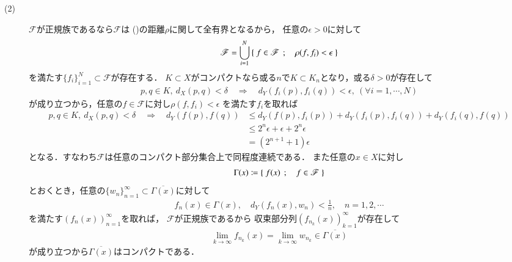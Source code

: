 \begin{prf}
\begin{description}
			\item[(2)] 
				$\mathscr{F}$が正規族であるなら$\mathscr{F}$は
				()の距離$\rho$に関して全有界となるから，
				任意の$\epsilon > 0$に対して
				\begin{align}
					\mathscr{F}
					= \bigcup_{i=1}^N \left\{\ f \in \mathscr{F}\ \, ; \quad \rho(f,f_i) < \epsilon\ \right\}
				\end{align}
				を満たす$\{f_i\}_{i=1}^N \subset \mathscr{F}$が存在する．
				$K \subset X$がコンパクトなら或る$n$で$K \subset K_n$となり，或る$\delta > 0$が存在して
				\begin{align}
					p,q \in K,\ d_X(p,q) < \delta
					\quad \Longrightarrow \quad
					d_Y(f_i(p),f_i(q)) < \epsilon,\ (\forall i = 1,\cdots,N)
				\end{align}
				が成り立つから，任意の$f \in \mathscr{F}$に対し$\rho(f,f_i) < \epsilon$
				を満たす$f_i$を取れば
				\begin{align}
					p,q \in K,\ d_X(p,q) < \delta
					\quad \Longrightarrow \quad
					d_Y(f(p),f(q)) 
					&\leq d_Y(f(p),f_i(p)) + d_Y(f_i(p),f_i(q)) + d_Y(f_i(q),f(q)) \\
					&\leq 2^n \epsilon + \epsilon + 2^n \epsilon \\
					&= (2^{n+1} + 1)\epsilon
				\end{align}
				となる．すなわち$\mathscr{F}$は任意のコンパクト部分集合上で同程度連続である．
				また任意の$x \in X$に対し
				\begin{align}
					\Gamma(x) \coloneqq \left\{\ f(x)\ \, ; \quad f \in \mathscr{F}\ \right\}
				\end{align}
				とおくとき，任意の$\{w_n\}_{n=1}^\infty \subset \overline{\Gamma(x)}$に対して
				\begin{align}
					f_n(x) \in \Gamma(x),
					\quad d_Y(f_n(x),w_n) < \frac{1}{n}, \quad n=1,2,\cdots
				\end{align}
				を満たす$\left(f_n(x)\right)_{n=1}^\infty$を取れば，
				$\mathscr{F}$が正規族であるから
				収束部分列$\left(f_{n_k}(x)\right)_{k=1}^\infty$が存在して
				\begin{align}
					\lim_{k \to \infty} f_{n_k}(x)
					= \lim_{k \to \infty} w_{n_k}
					\in \overline{\Gamma(x)}
				\end{align}
				が成り立つから$\overline{\Gamma(x)}$はコンパクトである．
				\QED
		\end{description}
	\end{prf}